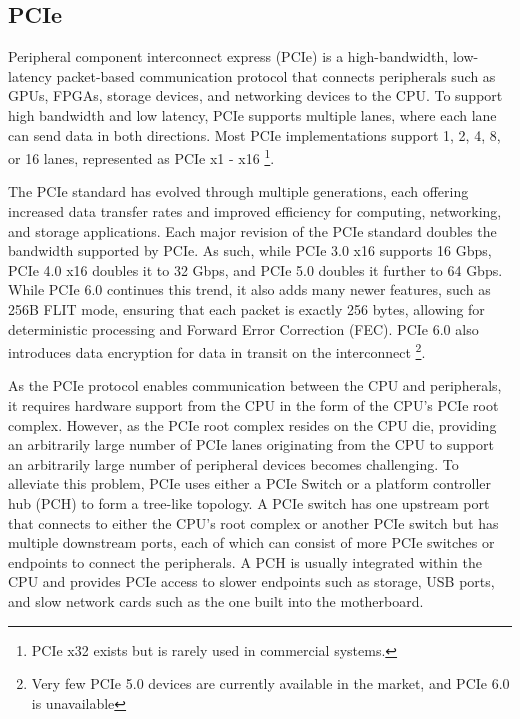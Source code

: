 \subsection{PCIe}
\label{subsec:interconnect-sc-background-pcie}

Peripheral component interconnect express (PCIe) is a high-bandwidth, low-latency packet-based communication protocol that connects peripherals such as GPUs, FPGAs, storage devices, and networking devices to the CPU. 
To support high bandwidth and low latency, PCIe supports multiple lanes, where each lane can send data in both directions.
Most PCIe implementations support 1, 2, 4, 8, or 16 lanes, represented as PCIe x1 - x16
\footnote{PCIe x32 exists but is rarely used in commercial systems.}.

The PCIe standard has evolved through multiple generations, each offering increased data transfer rates and improved efficiency for computing, networking, and storage applications.
Each major revision of the PCIe standard doubles the bandwidth supported by PCIe.
As such, while PCIe 3.0 x16 supports 16 Gbps, PCIe 4.0 x16 doubles it to 32 Gbps, and PCIe 5.0 doubles it further to 64 Gbps.
While PCIe 6.0 continues this trend, it also adds many newer features, such as 256B FLIT mode, ensuring that each packet is exactly 256 bytes, allowing for deterministic processing and Forward Error Correction (FEC).
PCIe 6.0 also introduces data encryption for data in transit on the interconnect
\footnote{Very few PCIe 5.0 devices are currently available in the market, and PCIe 6.0 is unavailable}.

As the PCIe protocol enables communication between the CPU and peripherals, it requires hardware support from the CPU in the form of the CPU's PCIe root complex.
However, as the PCIe root complex resides on the CPU die, providing an arbitrarily large number of PCIe lanes originating from the CPU to support an arbitrarily large number of peripheral devices becomes challenging.
To alleviate this problem, PCIe uses either a PCIe Switch or a platform controller hub (PCH) to form a tree-like topology.
A PCIe switch has one upstream port that connects to either the CPU's root complex or another PCIe switch but has multiple downstream ports, each of which can consist of more PCIe switches or endpoints to connect the peripherals.
A PCH is usually integrated within the CPU and provides PCIe access to slower endpoints such as storage, USB ports, and slow network cards such as the one built into the motherboard.


